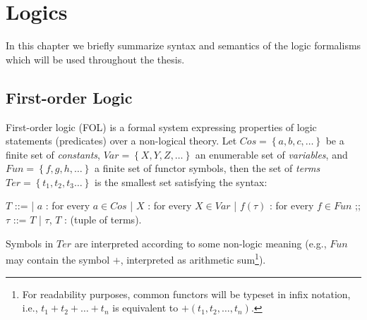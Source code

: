\chapter{Logics}\label{chap:logics}
In this chapter we briefly summarize syntax and semantics of the logic formalisms which will be used throughout the thesis.

\section{First-order Logic}
First-order logic (FOL) is a formal system expressing properties of logic statements (predicates) over a non-logical theory.
Let $\textit{Cos} = \left\{a, b, c, \dots\right\}$ be a finite set of \textit{constants}, $Var = \left\{X, Y, Z, \dots\right\}$ an enumerable set of \textit{variables}, and $\textit{Fun} = \left\{f, g, h, \dots\right\}$ a finite set of functor symbols, then the set of \textit{terms} $\textit{Ter} = \left\{t_1, t_2, t_3 \dots\right\}$ is the smallest set satisfying the syntax:
\begin{center}
	\begin{bnf}
		$T$ ::=
		| $a$ : for every $a \in \textit{Cos}$
		| $X$ : for every $X \in \textit{Var}$
		| $f(\tau)$ : for every $f \in \textit{Fun}$
		;;
		$\tau$ ::= $T$
		 | $\tau$, $T$ : (tuple of terms).
	\end{bnf}
\end{center}
Symbols in $\textit{Ter}$ are interpreted according to some non-logic meaning (e.g., $Fun$ may contain the symbol $+$, interpreted as arithmetic sum\footnote{For readability purposes, common functors will be typeset in infix notation, i.e., $t_1 + t_2 + \dots + t_n$ is equivalent to $+(t_1, t_2, \dots, t_n)$.}).

